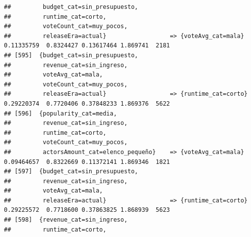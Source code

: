 \documentclass[
]{article}
\begin{document}
\begin{verbatim}
##         budget_cat=sin_presupuesto,                                                                                             
##         runtime_cat=corto,                                                                                                      
##         voteCount_cat=muy_pocos,                                                                                                
##         releaseEra=actual}                  => {voteAvg_cat=mala}                0.11335759  0.8324427 0.13617464 1.869741  2181
## [595]  {budget_cat=sin_presupuesto,                                                                                             
##         revenue_cat=sin_ingreso,                                                                                                
##         voteAvg_cat=mala,                                                                                                       
##         voteCount_cat=muy_pocos,                                                                                                
##         releaseEra=actual}                  => {runtime_cat=corto}               0.29220374  0.7720406 0.37848233 1.869376  5622
## [596]  {popularity_cat=media,                                                                                                   
##         revenue_cat=sin_ingreso,                                                                                                
##         runtime_cat=corto,                                                                                                      
##         voteCount_cat=muy_pocos,                                                                                                
##         actorsAmount_cat=elenco_pequeño}    => {voteAvg_cat=mala}                0.09464657  0.8322669 0.11372141 1.869346  1821
## [597]  {budget_cat=sin_presupuesto,                                                                                             
##         revenue_cat=sin_ingreso,                                                                                                
##         voteAvg_cat=mala,                                                                                                       
##         releaseEra=actual}                  => {runtime_cat=corto}               0.29225572  0.7718600 0.37863825 1.868939  5623
## [598]  {revenue_cat=sin_ingreso,                                                                                                
##         runtime_cat=corto,                                                                                                      

\end{verbatim}
\end{document}
